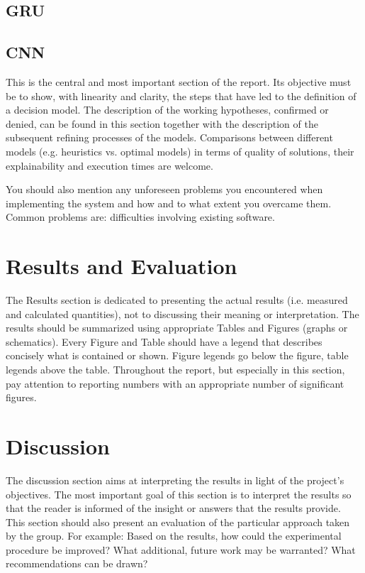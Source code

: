\subsection{GRU}

\subsection{CNN}





This is the central and most important section of the report. Its objective must be to show, with linearity and clarity, the steps that have led to the definition of a decision model. The description of the working hypotheses, confirmed or denied, can be found in this section together with the description of the subsequent refining processes of the models. Comparisons between different models (e.g. heuristics vs. optimal models) in terms of quality of solutions, their explainability and execution times are welcome. 

You should also mention any unforeseen problems you encountered when implementing the
system and how and to what extent you overcame them. Common problems are:
 difficulties involving existing software.


\section{Results and Evaluation}
The Results section is dedicated to presenting the actual results (i.e. measured and calculated quantities), not to discussing their meaning or interpretation. The results should be summarized using appropriate Tables and Figures (graphs or schematics). Every Figure and Table should have a legend that describes concisely what is contained or shown. Figure legends go below the figure, table legends above the table. Throughout the report, but especially in this section, pay attention to reporting numbers with an appropriate number of significant figures. 

\section{Discussion}
The discussion section aims at interpreting the results in light of the project's objectives. The most important goal of this section is to interpret the results so that the reader is informed of the insight or answers that the results provide. This section should also present an evaluation of the particular approach taken by the group. For example: Based on the results, how could the experimental procedure be improved? What additional, future work may be warranted? What recommendations can be drawn?


